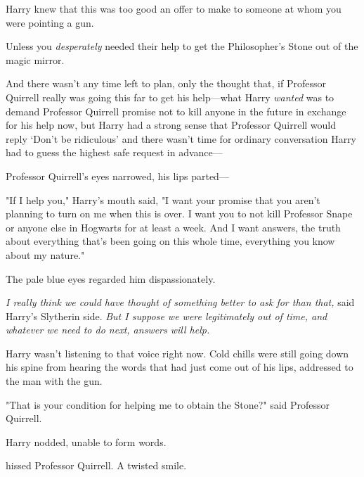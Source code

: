 Harry knew that this was too good an offer to make to someone at whom you were
pointing a gun.

Unless you \emph{desperately} needed their help to get the Philosopher's Stone
out of the magic mirror.

And there wasn't any time left to plan, only the thought that, if Professor
Quirrell really was going this far to get his help---what Harry \emph{wanted}
was to demand Professor Quirrell promise not to kill anyone in the future in
exchange for his help now, but Harry had a strong sense that Professor Quirrell
would reply `Don't be ridiculous' and there wasn't time for ordinary
conversation Harry had to guess the highest safe request in advance\mbox{---}

Professor Quirrell's eyes narrowed, his lips parted\mbox{---}

"If I help you," Harry's mouth said, "I want your promise that you aren't
planning to turn on me when this is over. I want you to not kill Professor
Snape or anyone else in Hogwarts for at least a week. And I want answers, the
truth about everything that's been going on this whole time, everything you
know about my nature."

The pale blue eyes regarded him dispassionately.

\emph{I really think we could have thought of something better to ask for than
that,} said Harry's Slytherin side. \emph{But I suppose we were legitimately
out of time, and whatever we need to do next, answers will help.}

Harry wasn't listening to that voice right now. Cold chills were still going
down his spine from hearing the words that had just come out of his lips,
addressed to the man with the gun.

"That is your condition for helping me to obtain the Stone?" said Professor
Quirrell.

Harry nodded, unable to form words.

 hissed Professor Quirrell.  A twisted smile.

